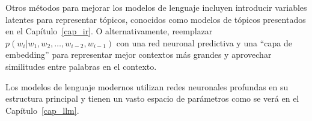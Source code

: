     
Otros métodos para mejorar los modelos de lenguaje incluyen introducir variables latentes para representar tópicos, conocidos como modelos de tópicos \cite{blei2003latent} presentados en el Capítulo~\ref{cap_ir}. O alternativamente, reemplazar $p(w_i | w_1, w_2, \ldots, w_{i-2}, w_{i-1})$ con una red neuronal predictiva y una ``capa de embedding'' para representar mejor contextos más grandes y aprovechar similitudes entre palabras en el contexto. \cite{bengio2000neural}

Los modelos de lenguaje modernos utilizan redes neuronales profundas en su estructura principal y tienen un vasto espacio de parámetros como se verá en el Capítulo~\ref{cap_llm}.


